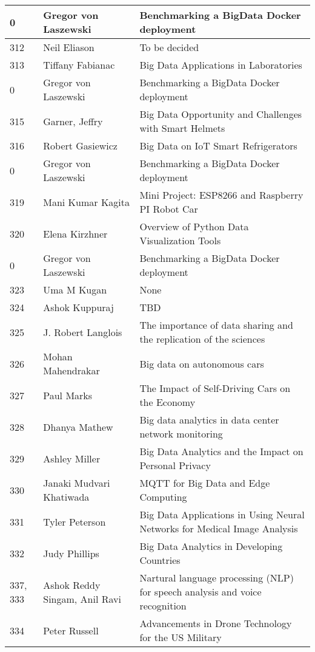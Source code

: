 \documentclass[12pt]{book}
\begin{document}
\begin{footnotesize}
\begin{longtable}{|p{1cm}p{5cm}p{9cm}|}
\hline
0 & Gregor von Laszewski & Benchmarking a BigData Docker deployment  \\
\hline
312 & Neil Eliason & To be decided  \\
\hline
313 & Tiffany Fabianac & Big Data Applications in Laboratories  \\
\hline
0 & Gregor von Laszewski & Benchmarking a BigData Docker deployment  \\
\hline
315 & Garner, Jeffry & Big Data Opportunity and Challenges with Smart Helmets  \\
\hline
316 & Robert Gasiewicz & Big Data on IoT Smart Refrigerators  \\
\hline
0 & Gregor von Laszewski & Benchmarking a BigData Docker deployment  \\
\hline
319 & Mani Kumar Kagita & Mini Project: ESP8266 and Raspberry PI Robot Car  \\
\hline
320 & Elena Kirzhner & Overview of Python Data Visualization Tools  \\
\hline
0 & Gregor von Laszewski & Benchmarking a BigData Docker deployment  \\
\hline
323 & Uma M Kugan & None  \\
\hline
324 & Ashok Kuppuraj & TBD  \\
\hline
325 & J. Robert Langlois & The importance of data sharing and the replication of the sciences  \\
\hline
326 & Mohan Mahendrakar & Big data on autonomous cars  \\
\hline
327 & Paul Marks & The Impact of Self-Driving Cars on the Economy  \\
\hline
328 & Dhanya Mathew & Big data analytics in data center network monitoring  \\
\hline
329 & Ashley Miller & Big Data Analytics and the Impact on Personal Privacy  \\
\hline
330 & Janaki Mudvari Khatiwada & MQTT for Big Data and Edge Computing  \\
\hline
331 & Tyler Peterson & Big Data Applications in Using Neural Networks for Medical Image Analysis  \\
\hline
332 & Judy Phillips & Big Data Analytics in Developing Countries  \\
\hline
337, 333 & Ashok Reddy Singam, Anil Ravi & Nartural language processing (NLP) for speech analysis and voice recognition  \\
\hline
334 & Peter Russell & Advancements in Drone Technology for the US Military  \\

\end{longtable}
\end{footnotesize}
\end{document}

